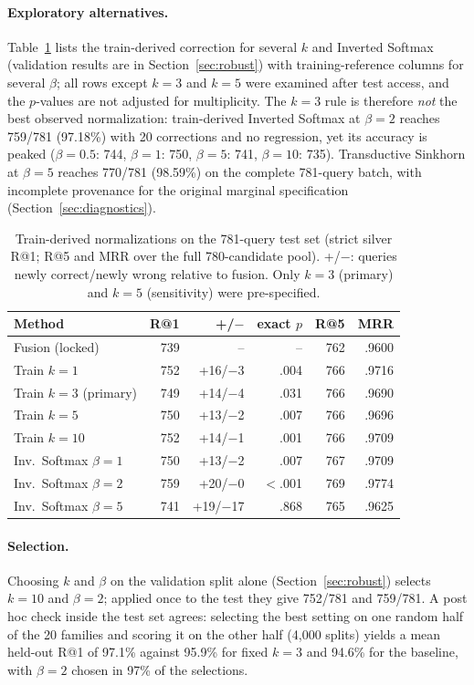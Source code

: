 \paragraph{Exploratory alternatives.} Table~\ref{tab:grid} lists the train-derived correction for several $k$ and Inverted Softmax (validation results are in Section~\ref{sec:robust}) with training-reference columns for several $\beta$; all rows except $k=3$ and $k=5$ were examined after test access, and the $p$-values are not adjusted for multiplicity. The $k=3$ rule is therefore \emph{not} the best observed normalization: train-derived Inverted Softmax at $\beta=2$ reaches 759/781 (97.18\%) with 20 corrections and no regression, yet its accuracy is peaked ($\beta=0.5$: 744, $\beta=1$: 750, $\beta=5$: 741, $\beta=10$: 735). Transductive Sinkhorn at $\beta=5$ reaches 770/781 (98.59\%) on the complete 781-query batch, with incomplete provenance for the original marginal specification (Section~\ref{sec:diagnostics}).

\begin{table}[t]
\centering\small
\caption{Train-derived normalizations on the 781-query test set (strict silver R@1; R@5 and MRR over the full 780-candidate pool). +/$-$: queries newly correct/newly wrong relative to fusion. Only $k=3$ (primary) and $k=5$ (sensitivity) were pre-specified.}
\label{tab:grid}
\begin{tabular}{lrrrrr}
\toprule
Method & R@1 & +/$-$ & exact $p$ & R@5 & MRR \\
\midrule
Fusion (locked) & 739 & -- & -- & 762 & .9600 \\
Train $k=1$ & 752 & +16/$-$3 & .004 & 766 & .9716 \\
Train $k=3$ (primary) & 749 & +14/$-$4 & .031 & 766 & .9690 \\
Train $k=5$ & 750 & +13/$-$2 & .007 & 766 & .9696 \\
Train $k=10$ & 752 & +14/$-$1 & .001 & 766 & .9709 \\
Inv.\ Softmax $\beta=1$ & 750 & +13/$-$2 & .007 & 767 & .9709 \\
Inv.\ Softmax $\beta=2$ & 759 & +20/$-$0 & $<$.001 & 769 & .9774 \\
Inv.\ Softmax $\beta=5$ & 741 & +19/$-$17 & .868 & 765 & .9625 \\
\bottomrule
\end{tabular}
\end{table}

\paragraph{Selection.} Choosing $k$ and $\beta$ on the validation split alone (Section~\ref{sec:robust}) selects $k=10$ and $\beta=2$; applied once to the test they give 752/781 and 759/781. A post hoc check inside the test set agrees: selecting the best setting on one random half of the 20 families and scoring it on the other half (4,000 splits) yields a mean held-out R@1 of 97.1\% against 95.9\% for fixed $k=3$ and 94.6\% for the baseline, with $\beta=2$ chosen in 97\% of the selections.

